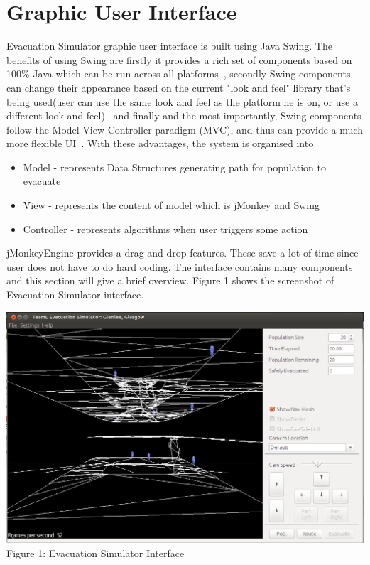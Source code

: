 \documentclass[a4paper,10pt]{article}
\begin{document}
\section{Graphic User Interface}
Evacuation Simulator graphic user interface is built using Java Swing. The benefits of using Swing are firstly it provides a rich set of 
components based on 100\% Java which can be run across all platforms~\cite{jGuru}, secondly Swing components can change their appearance based on the current 
"look and feel" library that's being used(user can use the same look and feel as the platform he is on, or use a different look and feel)~\cite{jGuru} and 
finally and the most importantly, Swing components follow the Model-View-Controller paradigm (MVC), and thus can provide a much more flexible UI~\cite{mvc}.
With these advantages, the system is organised into
\begin{itemize}
 \item Model - represents Data Structures generating path for population to evacuate
 \item View - represents the content of model which is jMonkey and Swing
 \item Controller - represents algorithms when user triggers some action
\end{itemize}
jMonkeyEngine provides a drag and drop features. These save a lot of time since user does not have to do hard coding.
The interface contains many components and this section will give a brief overview. Figure 1 shows the screenshot of Evacuation Simulator interface.
\\
\begin{center}
\includegraphics[scale=0.3]{gui.png}
\\Figure 1: Evacuation Simulator Interface
\end{center}
\end{document}

